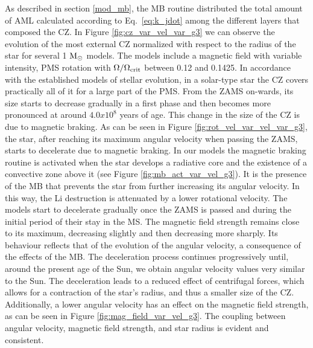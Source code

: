 \documentclass[fleqn,usenatbib]{mnras}
\begin{document}
As described in section \ref{mod_mb}, the MB routine distributed the total amount of AML calculated according to Eq.~\ref{eq:k_jdot} among the different layers that composed the CZ. In Figure \ref{fig:cz_var_vel_var_g3} we can observe the evolution of the most external CZ normalized with respect to the radius of the star for several 1 $\mathrm{M}_\odot$ models. The models include a magnetic field with variable intensity, PMS rotation with $\Omega / \Omega_{\mathrm{crit}}$ between 0.12 and 0.1425. In accordance with the established models of stellar evolution, in a solar-type star the CZ covers practically all of it for a large part of the PMS. From the ZAMS on-wards, its size starts to decrease gradually in a first phase and then becomes more pronounced at around $4.0x10^8$ years of age. This change in the size of the CZ is due to magnetic braking. As can be seen in Figure \ref{fig:rot_vel_var_vel_var_g3}, the star, after reaching its maximum angular velocity when passing the ZAMS, starts to decelerate due to magnetic braking. In our models the magnetic braking routine is activated when the star develops a radiative core and the existence of a convective zone above it (see Figure \ref{fig:mb_act_var_vel_g3}). It is the presence of the MB that prevents the star from further increasing its angular velocity. In this way, the Li destruction is attenuated by a lower rotational velocity. The models start to decelerate gradually once the ZAMS is passed and during the initial period of their stay in the MS. The magnetic field strength remains close to its maximum, decreasing slightly and then decreasing more sharply. Its behaviour reflects that of the evolution of the angular velocity, a consequence of the effects of the MB. The deceleration process continues progressively until, around the present age of the Sun, we obtain angular velocity values very similar to the Sun. The deceleration leads to a reduced effect of centrifugal forces, which allows for a contraction of the star's radius, and thus a smaller size of the CZ. Additionally, a lower angular velocity has an effect on the magnetic field strength, as can be seen in Figure \ref{fig:mag_field_var_vel_g3}. The coupling between angular velocity, magnetic field strength, and star radius is evident and consistent.\par
\end{document}
